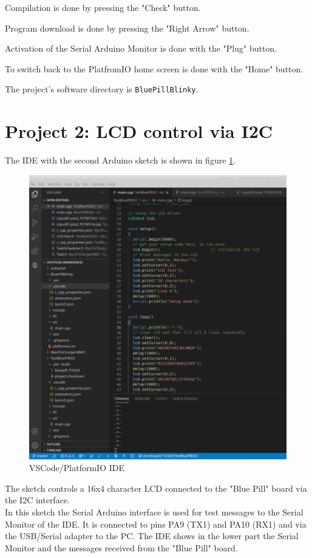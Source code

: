 \documentclass[11pt, oneside]{scrartcl}   	%
\begin{document}
Compilation is done by pressing the "Check" button.

Program download is done by pressing the "Right Arrow" button.

Activation of the Serial Arduino Monitor is done with the "Plug" button.

To switch back to the PlatfromIO home screen is done with the "Home" button. 

The project's software directory is \verb!BluePillBlinky!.


\newpage
\section{Project 2: LCD control via I2C}
The IDE with the second Arduino sketch is shown in figure \ref{fig:IDESetup2}.
\begin{figure}[htbp]
	\centering
	\includegraphics[width=0.85\linewidth]{Figures/Test_BluePill_I2C_LCD_IDE.png}
	\caption{VSCode/PlatformIO IDE}
	\label{fig:IDESetup2}
\end{figure}
The sketch controls a 16x4 character LCD connected to the "Blue Pill" board via the I2C interface.\\
In this sketch the Serial Arduino interface is used for test messages to the Serial Monitor of the IDE. It is connected to pins PA9 (TX1) and PA10 (RX1) and via the USB/Serial adapter to the PC. The IDE shows in the lower part the Serial Monitor and the messages received from the "Blue Pill" board.\\
\end{document}
